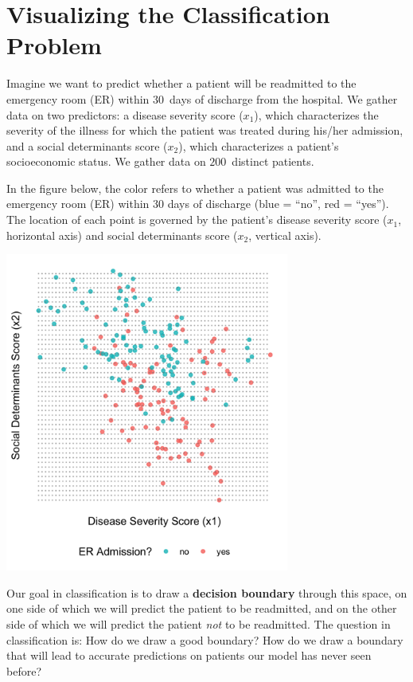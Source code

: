 
\section{Visualizing the Classification Problem \label{section:visualizingclass}}

Imagine we want to predict whether a patient will be readmitted to the emergency room (ER) within $30$~days of discharge from the hospital. We gather data on two predictors: a disease severity score ($x_1$), which characterizes the severity of the illness for which the patient was treated during his/her admission, and a social determinants score ($x_2$), which characterizes a patient's socioeconomic status. We gather data on $200$~distinct patients.

In the figure below, the color refers to whether a patient was admitted to the emergency room (ER) within 30 days of discharge (blue = ``no'', red = ``yes''). The location of each point is governed by the patient's disease severity score ($x_1$, horizontal axis) and social determinants score ($x_2$, vertical axis).

\begin{center}
\includegraphics[width=0.7\textwidth]{img/esl-just-data.png}
\end{center}

Our goal in classification is to draw a \textbf{decision boundary} through this space, on one side of which we will predict the patient to be readmitted, and on the other side of which we will predict the patient \emph{not} to be readmitted. The question in classification is: How do we draw a good boundary? How do we draw a boundary that will lead to accurate predictions on patients our model has never seen before?

